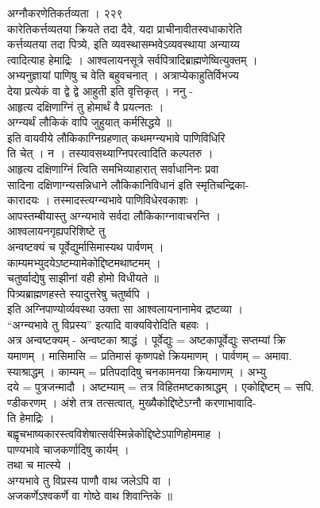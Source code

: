\documentclass[11pt, openany]{book}
\begin{document}
{{{{{{{{{{{{{{{{{{{{{{ }{ अग्नौकरणेतिकर्तव्यता । २२९}{\\
कारेतिकर्त्तव्यतया क्रियते तदा दैवे, यदा प्राचीनावीतस्वधाकारेति\\
कर्त्तव्यतया तदा पित्र्ये, इति व्यवस्थासम्भवेऽव्यवस्थाया अन्याय्य\\
त्वादित्याह हेमाद्रिः । आश्वलायनसूत्रे
सर्वपित्रादिब्राह्मणेष्वित्युक्तम् ।\\
अभ्यनुज्ञायां पाणिषु च वेति बहुवचनात् । अत्राप्येकाहुतिर्विभज्य\\
देया प्रत्येकं वा द्वे द्वे आहुती इति वृत्तिकृत् । ननु -\\
आहृत्य दक्षिणाग्निं तु होमार्थं वै प्रयत्नतः ।\\
अग्न्यर्थं लौकिकं वापि जुहुयात् कर्मसिद्धये ॥\\
इति वायवीये लौकिकाग्निग्रहणात् कथमग्न्यभावे पाणिविधिरि\\
ति चेत् । न । तस्यावसथ्याग्निपरत्वादिति कल्पतरु ।\\
आहृत्य दक्षिणाग्निं त्विति समभिव्याहारात् सर्वाधानिनः प्रवा\\
सादिना दक्षिणाग्न्यसन्निधाने लौकिकानिविधानं इति स्मृतिचन्द्रिका-\\
कारादयः । तस्मादस्त्यग्न्यभावे पाणिविधेरवकाशः ।\\
आपस्तम्बीयास्तु अग्न्यभावे सर्वदा लौकिकाग्नावाचरन्ति ।\\
आश्वलायनगृह्यपरिशिष्टे तु\\
अन्वष्टक्यं च पूर्वेद्युर्मासिमास्यथ पार्वणम् ।\\
काम्यमभ्युदयेऽष्टम्यामेकोद्दिष्टमथाष्टमम् ।\\
चतुर्ष्वाद्येषु साझीनां वही होमो विधीयते ॥\\
पित्र्यब्राह्मणहस्ते स्यादुत्तरेषु चतुर्ष्वपि ।\\
इति अग्निपाण्योर्व्यवस्था उक्ता सा आश्वलायनानामेव द्रष्टव्या ।\\
``अग्न्यभावे तु विप्रस्य'' इत्यादि वाक्यविरोदिति बहवः ।\\
अत्र अन्वष्टक्यम् - अन्वष्टका श्राद्धं । पूर्वेद्युः = अष्टकापूर्वेद्युः
सप्तम्यां क्रि\\
यमाणम् । मासिमासि = प्रतिमासं कृष्णपक्षे क्रियमाणम् । पार्वणम् =
अमावा.\\
स्याश्राद्धम् । काम्यम् = प्रतिपदादिषु चनकामनया क्रियमाणम् । अभ्यु\\
दये = पुत्रजन्मादौ । अष्टम्याम् = तत्र विहितमष्टकाश्राद्धम् ।
एकोद्दिष्टम् = सपि.\\
ण्डीकरणम् । अंशे तत्र तत्सत्वात्, मुख्यैकोद्दिष्टेऽग्नौ करणाभावादि-\\
ति हेमाद्रिः ।\\
बह्वृचभाष्यकारस्त्वविशेषात्सर्वस्मिन्नेकोद्दिष्टेऽपाणिहोममाह ।\\
पाण्यभावे चाजकर्णादिषु कार्यम् ।\\
तथा च मात्स्ये ।\\
अग्यभावे तु विप्रस्य पाणौ वाथ जलेऽपि वा ।\\
अजकर्णेऽश्वकर्णे वा गोष्ठे वाथ शिवान्तिके ॥\\


}}}}}}}}}}}}}}}}}}}}}}
\end{document}
